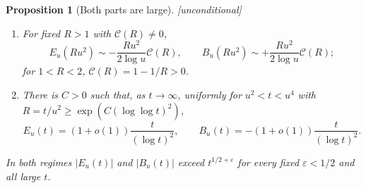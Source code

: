 \documentclass[11pt]{amsart}
\numberwithin{equation}{section}
\theoremstyle{plain}
\newtheorem{proposition}[theorem]{Proposition}
\theoremstyle{definition}
\theoremstyle{remark}
\newcommand{\eps}{\varepsilon}
\newcommand{\Cc}{\mathcal{C}}
\begin{document}
\begin{proposition}[Both parts are large]
\label{prop:both_parts_large}
\emph{[unconditional]}
\begin{enumerate}[label=\textup{(\roman*)}]
\item For fixed $R>1$ with $\Cc(R)\ne0$,
\begin{equation}
\label{eq:E_fixed_R_size}
  E_u(Ru^2)\sim-\frac{Ru^2}{2\log u}\Cc(R),\qquad
  B_u(Ru^2)\sim+\frac{Ru^2}{2\log u}\Cc(R);
\end{equation}
for $1<R<2$, $\Cc(R)=1-1/R>0$.
\item There is $C>0$ such that, as $t\to\infty$, uniformly for $u^2<t<u^4$
with $R=t/u^2\ge\exp(C(\log\log t)^2)$,
\begin{equation}
\label{eq:E_log2}
  E_u(t)=(1+o(1))\frac{t}{(\log t)^2},\qquad
  B_u(t)=-(1+o(1))\frac{t}{(\log t)^2}.
\end{equation}
\end{enumerate}
In both regimes $|E_u(t)|$ and $|B_u(t)|$ exceed $t^{1/2+\eps}$ for every
fixed $\eps<1/2$ and all large $t$.
\end{proposition}
\end{document}
